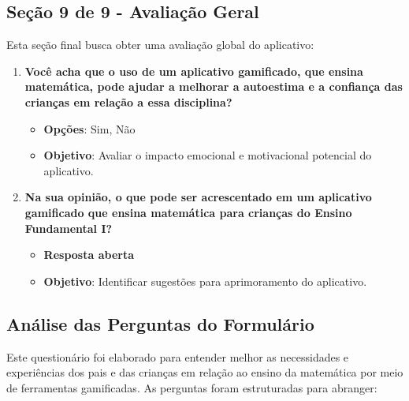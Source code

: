 \subsection{Seção 9 de 9 - Avaliação Geral}

Esta seção final busca obter uma avaliação global do aplicativo:

\begin{enumerate}
    \item \textbf{Você acha que o uso de um aplicativo gamificado, que ensina matemática, pode ajudar a melhorar a autoestima e a confiança das crianças em relação a essa disciplina?}
    \begin{itemize}
        \item \textbf{Opções}: Sim, Não
        \item \textbf{Objetivo}: Avaliar o impacto emocional e motivacional potencial do aplicativo.
    \end{itemize}

    \item \textbf{Na sua opinião, o que pode ser acrescentado em um aplicativo gamificado que ensina matemática para crianças do Ensino Fundamental I?}
    \begin{itemize}
        \item \textbf{Resposta aberta}
        \item \textbf{Objetivo}: Identificar sugestões para aprimoramento do aplicativo.
    \end{itemize}
\end{enumerate}

\subsection{Análise das Perguntas do Formulário}

Este questionário foi elaborado para entender melhor as necessidades e experiências dos pais e das crianças em relação ao ensino da matemática por meio de ferramentas gamificadas. As perguntas foram estruturadas para abranger:

